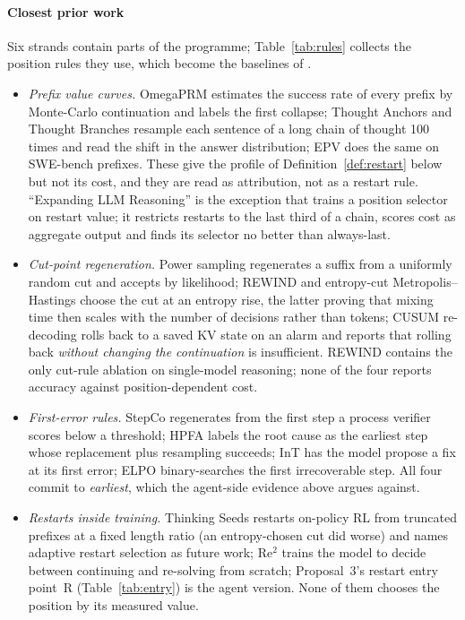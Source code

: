 \paragraph{Closest prior work} Six strands contain parts of the programme; Table~\ref{tab:rules} collects the position rules they use, which become the baselines of .
\begin{itemize}[leftmargin=1.1em]
\item \emph{Prefix value curves.} OmegaPRM \cite{luo2024omegaprm} estimates the success rate of every prefix by Monte-Carlo continuation and labels the first collapse; Thought Anchors and Thought Branches \cite{bogdan2025thoughtanchors,macar2025thoughtbranches} resample each sentence of a long chain of thought 100 times and read the shift in the answer distribution; EPV \cite{shen2026epv} does the same on SWE-bench prefixes. These give the profile of Definition~\ref{def:restart} below but not its cost, and they are read as attribution, not as a restart rule. ``Expanding LLM Reasoning'' \cite{atri2026expanding} is the exception that trains a position selector on restart value; it restricts restarts to the last third of a chain, scores cost as aggregate output and finds its selector no better than always-last.
\item \emph{Cut-point regeneration.} Power sampling \cite{karan2026power} regenerates a suffix from a uniformly random cut and accepts by likelihood; REWIND \cite{ding2026rewind} and entropy-cut Metropolis--Hastings \cite{zhou2026entropycut} choose the cut at an entropy rise, the latter proving that mixing time then scales with the number of decisions rather than tokens; CUSUM re-decoding \cite{ettifouri2026cusum} rolls back to a saved KV state on an alarm and reports that rolling back \emph{without changing the continuation} is insufficient. REWIND contains the only cut-rule ablation on single-model reasoning; none of the four reports accuracy against position-dependent cost.
\item \emph{First-error rules.} StepCo \cite{wu2024stepco} regenerates from the first step a process verifier scores below a threshold; HPFA \cite{zhu2026hpfa} labels the root cause as the earliest step whose replacement plus resampling succeeds; InT \cite{yang2026int} has the model propose a fix at its first error; ELPO \cite{liang2026elpo} binary-searches the first irrecoverable step. All four commit to \emph{earliest}, which the agent-side evidence above argues against.
\item \emph{Restarts inside training.} Thinking Seeds \cite{yang2026thinkingseeds} restarts on-policy RL from truncated prefixes at a fixed length ratio (an entropy-chosen cut did worse) and names adaptive restart selection as future work; Re$^2$ \cite{wang2026resolve} trains the model to decide between continuing and re-solving from scratch; Proposal~3's restart entry point~R (Table~\ref{tab:entry}) is the agent version. None of them chooses the position by its measured value.

\end{itemize}
